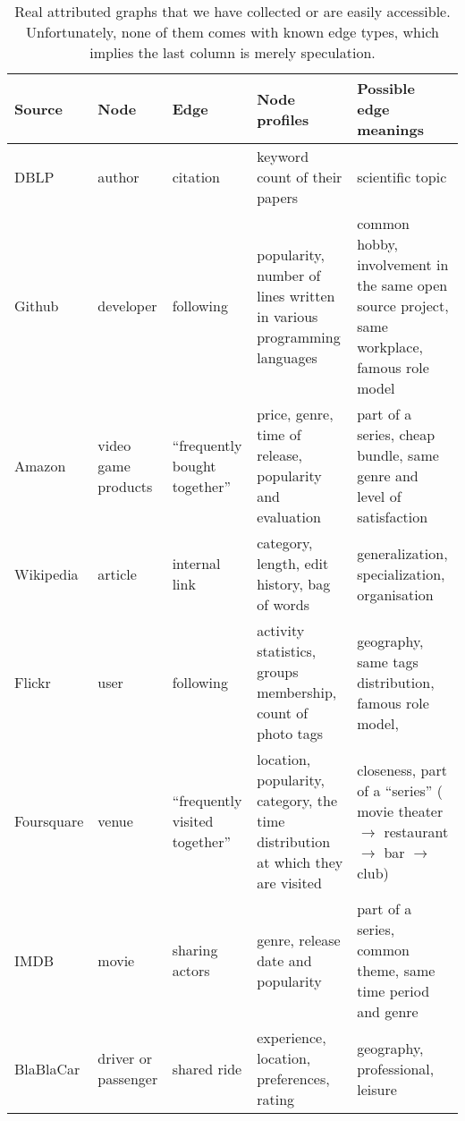 \setlength{\fullpage}{179mm}
\begin{table}[h]
\begin{adjustwidth}{-2cm}{}
  \small
  \setlength{\tabcolsep}{4pt}
  \centering
  \caption{Real attributed graphs that we have collected or are easily accessible. Unfortunately,
    none of them comes with known edge types, which implies the last column is merely speculation.
  \label{tab:edge_apps}}
  {\renewcommand{\arraystretch}{0.95}%
  \begin{tabulary}{\fullpage}{lLLLL}
    \toprule
    {Source} & {Node} & {Edge} & {Node profiles} & {Possible edge meanings} \\
    \midrule
    DBLP & author & citation & keyword count of their papers & scientific topic \\
    Github & developer & following & popularity, number of lines written in various programming languages &
    common hobby, involvement in the same open source project, same
    workplace, famous role model \\
    Amazon & video game products & \enquote{frequently bought together} & price, genre, time of release, popularity and evaluation &
    part of a series, cheap bundle, same genre and level of satisfaction \\
    Wikipedia & article & internal link & category, length, edit history, bag of words &
    generalization, specialization, organisation \\
    Flickr & user & following & activity statistics, groups membership, count of photo tags &
    geography, same tags distribution, famous role model,  \\ 
    Foursquare & venue & \enquote{frequently visited together} & location, popularity, category, the time distribution at which they are visited &
    closeness, part of a \enquote{series} (\eg{} movie theater $\rightarrow$ restaurant $\rightarrow$
    bar $\rightarrow$ club) \\
    IMDB & movie & sharing actors & genre, release date and popularity &
    part of a series, common theme, same time period and genre \\
    BlaBlaCar & driver or passenger & shared ride & experience, location, preferences, rating &
    geography, professional, leisure \\
    \bottomrule
  \end{tabulary}}
\end{adjustwidth}
\end{table}

